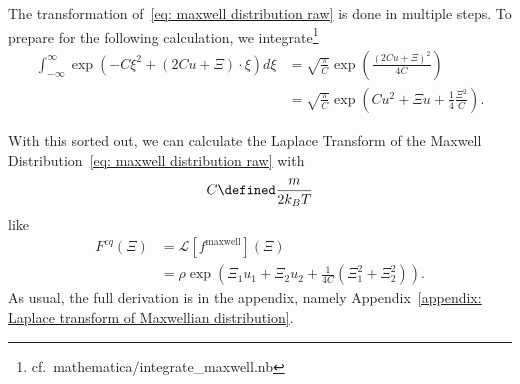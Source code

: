 The transformation of~\eqref{eq: maxwell distribution raw} is done in multiple steps.
To prepare for the following calculation, we integrate\footnote{cf.\ mathematica/integrate\_maxwell.nb}
\begin{equation}
  \label{eq:integrate exponential sage}
  \begin{aligned}
    \int_{-\infty}^{\infty} \exp \left(-C \xi^2 + (2Cu + \Xi)\cdot\xi \right) d\xi
    & = \sqrt{\frac{\pi}{C}}\exp \left( \frac{{(2Cu + \Xi)}^2}{4C}\right)
    \\
    & = \sqrt{\frac{\pi}{C}}\exp \left(Cu^2 + \Xi u + \frac{1}{4} \frac{\Xi^2}{C}\right)
    .
  \end{aligned}
\end{equation}

With this sorted out, we can calculate the Laplace Transform of the Maxwell Distribution~\eqref{eq: maxwell distribution raw} with
\begin{equation}
  C \defined \frac{m}{2 k_B T}
\end{equation}
like
\begin{equation}
  \label{eq: laplace of maxwell}
  \begin{aligned}
    F^{eq}(\Xi) & = \mathcal{L}[f^{\text{maxwell}}](\Xi)
    \\& = \rho
      \exp \left( \Xi_1 u_1 + \Xi_2 u_2 + \frac{1}{4C}\left(\Xi_1^2 + \Xi_2^2 \right)\right).
  \end{aligned}
\end{equation}
As usual, the full derivation is in the appendix, namely Appendix~\ref{appendix: Laplace transform of Maxwellian distribution}.
